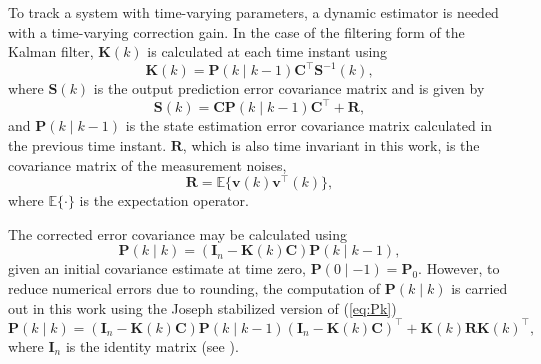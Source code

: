 To track a system with time-varying parameters, a dynamic estimator is needed with a time-varying correction gain. In the case of the filtering form of the Kalman filter, $\mathbf{K}(k)$ is calculated at each time instant using
\begin{equation} \label{eq:Kk}
	\mathbf{K}(k) = \mathbf{P}(k \mid k-1)\mathbf{C}^\intercal \mathbf{S}^{-1}(k),
\end{equation}
where $\mathbf{S}(k)$ is the output prediction error covariance matrix and is given by
%
\begin{equation} \label{eq:Sk}
	\mathbf{S}(k) = \mathbf{C}\mathbf{P}(k \mid k-1)\mathbf{C}^\intercal + \mathbf{R},
\end{equation}
%
and $\mathbf{P}(k \mid k-1)$ is the state estimation error covariance matrix calculated in the previous time instant. $\mathbf{R}$, which is also time invariant in this work, is the covariance matrix of the measurement noises,
%
\begin{equation} \label{eq:R}
	 \mathbf{R} = \mathbb{E}\{ \mathbf{v}(k) \mathbf{v}^\intercal(k) \},
\end{equation}
%
where $\mathbb{E}\{\cdot\}$ is the expectation operator.

The corrected error covariance may be calculated using
%
\begin{equation} \label{eq:Pk}
	\mathbf{P}(k \mid k) = \left( \mathbf{I}_n - \mathbf{K}(k) \mathbf{C} \right) \mathbf{P}(k \mid k-1),
\end{equation}
given an initial covariance estimate at time zero, $\mathbf{P}(0 \mid -1)=\mathbf{P}_0$. However, to reduce numerical errors due to rounding, the computation of $\mathbf{P}(k \mid k)$ is carried out in this work using the Joseph stabilized version of (\ref{eq:Pk})
 \begin{equation} \label{eq:Pk-stab}
 	\mathbf{P}(k \mid k) = \left( \mathbf{I}_n - \mathbf{K}(k) \mathbf{C} \right ) \mathbf{P}(k \mid k-1) \left( \mathbf{I}_n - \mathbf{K}(k) \mathbf{C} \right )^\intercal + \mathbf{K}(k)  \mathbf{R} \mathbf{K}(k)^\intercal,
 \end{equation}
%
where $\mathbf{I}_n$ is the identity matrix (see \cite{lewis_optimal_2008}).

